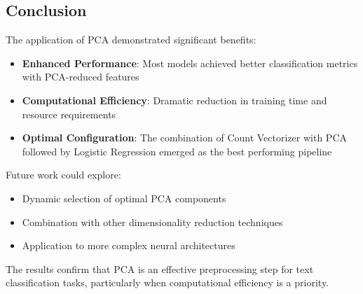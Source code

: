 \subsection{Conclusion}
The application of PCA demonstrated significant benefits:
\begin{itemize}
    \item \textbf{Enhanced Performance}: Most models achieved better classification metrics with PCA-reduced features
    \item \textbf{Computational Efficiency}: Dramatic reduction in training time and resource requirements
    \item \textbf{Optimal Configuration}: The combination of Count Vectorizer with PCA followed by Logistic Regression emerged as the best performing pipeline
\end{itemize}

Future work could explore:
\begin{itemize}
    \item Dynamic selection of optimal PCA components
    \item Combination with other dimensionality reduction techniques
    \item Application to more complex neural architectures
\end{itemize}

The results confirm that PCA is an effective preprocessing step for text classification tasks, particularly when computational efficiency is a priority.
